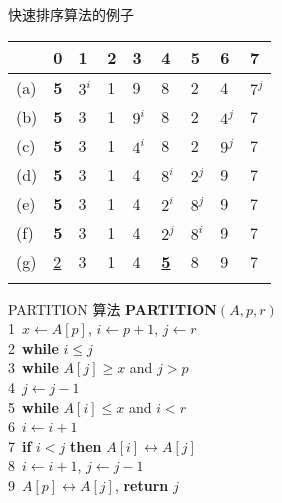 \documentclass[fontset=fandol,UTF8,fleqn]{beamer}
\begin{document}
\begin{frame}{快速排序算法的例子}
\begin{table}
  \centering
  \begin{tabular}{lllllllll}
& 0 & 1 & 2 & 3 & 4 & 5 & 6 & 7 \\
\hline
(a) & {\textbf{5}} & $3^i$ & 1 & 9 & 8 & 2 & 4 & $7^j$    \\
(b) & {\textbf{5}} & 3 & 1 & \underline{$9^i$} & 8 & 2 & \underline{$4^j$} & 7   \\
(c) & {\textbf{5}} & 3 & 1 & $4^i$ & 8 & 2 & $9^j$ & 7   \\
(d) & {\textbf{5}} & 3 & 1 & 4 & \underline{$8^i$} & \underline{$2^j$} & 9 & 7   \\
(e) & {\textbf{5}} & 3 & 1 & 4 & $2^i$ & $8^j$ & 9 & 7   \\
(f) & {\textbf{5}} & 3 & 1 & 4 & \underline{$2^j$} & $8^i$ & 9 & 7   \\    
(g) & \underline{2} & 3 & 1 & 4 & \underline{{\textbf{5}}} &  8 & 9 & 7   \\
\\
   \end{tabular}
\end{table}
\end{frame}

\begin{frame}{\textsf{PARTITION} 算法}
\textbf{PARTITION}$(A,p,r)$\\
1\qquad\  $x\gets  A[p]$, $i\gets  p+1$,   $j\gets  r$\\
2\qquad\  \textbf{while} $i \leq j$ \\
3\qquad\  \qquad \textbf{while} $A[j]\geq  x$ and $j > p$\\
4\qquad\  \qquad \qquad     $j\gets j-1$\\
5\qquad\ \qquad  \textbf{while}    $A[i]\le  x$ and $i < r$\\
6\qquad\  \qquad \qquad  $i\gets i+1$ \\
7\qquad\  \qquad       \textbf{if} $i < j$   \textbf{then}  $A[i]\leftrightarrow  A[j]$\\
8\qquad\ \qquad  \qquad $i\gets i+1$, $j\gets j-1$\\
9\qquad\   $A[p]\leftrightarrow A[j]$,  \textbf{return} $j$\\
\end{frame}
\end{document}

